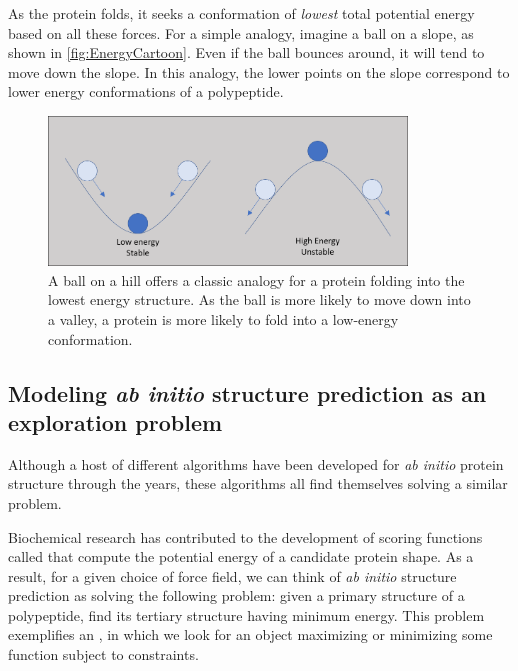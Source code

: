 As the protein folds, it seeks a conformation of \textit{lowest} total potential energy based on all these forces. For a simple analogy, imagine a ball on a slope, as shown in \autoref{fig:EnergyCartoon}. Even if the ball bounces around, it will tend to move down the slope. In this analogy, the lower points on the slope correspond to lower energy conformations of a polypeptide.\\

\begin{figure}[h]
	\centering
	\mySfFamily
	\includegraphics[width = 0.85\textwidth]{../images/EnergyCartoon.png}
	\caption{A ball on a hill offers a classic analogy for a protein folding into the lowest energy structure. As the ball is more likely to move down into a valley, a protein is more likely to fold into a low-energy conformation.}
	\label{fig:EnergyCartoon}
\end{figure}

\FloatBarrier
{}
\subsection{Modeling \textit{ab initio} structure prediction as an exploration problem}

Although a host of different algorithms have been developed for \textit{ab initio} protein structure through the years, these algorithms all find themselves solving a similar problem.

Biochemical research has contributed to the development of scoring functions called  that compute the potential energy of a candidate protein shape. As a result, for a given choice of force field, we can think of \textit{ab initio} structure prediction as solving the following problem: given a primary structure of a polypeptide, find its tertiary structure having minimum energy. This problem exemplifies an , in which we look for an object maximizing or minimizing some function subject to constraints.

